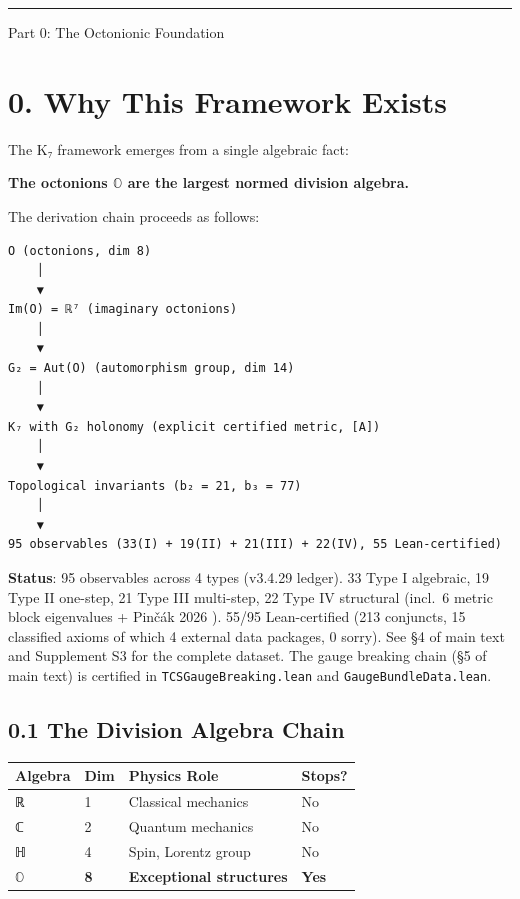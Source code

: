 \documentclass[11pt,a4paper]{article}
\begin{document}
\begin{center}\rule{\linewidth}{0.5pt}\end{center}

Part 0: The Octonionic Foundation

\section{0. Why This Framework Exists}\label{why-this-framework-exists}

The K₇ framework emerges from a single algebraic fact:

\textbf{The octonions \ensuremath{\mathbb{O}} are the largest normed division algebra.}

The derivation chain proceeds as follows:

\begin{verbatim}
O (octonions, dim 8)
    │
    ▼
Im(O) = ℝ⁷ (imaginary octonions)
    │
    ▼
G₂ = Aut(O) (automorphism group, dim 14)
    │
    ▼
K₇ with G₂ holonomy (explicit certified metric, [A])
    │
    ▼
Topological invariants (b₂ = 21, b₃ = 77)
    │
    ▼
95 observables (33(I) + 19(II) + 21(III) + 22(IV), 55 Lean-certified)
\end{verbatim}

\textbf{Status}: 95 observables across 4 types (v3.4.29 ledger). 33 Type I algebraic, 19 Type II one-step, 21 Type III multi-step, 22 Type IV structural (incl.~6 metric block eigenvalues + Pinčák 2026 \cite{42}). 55/95 Lean-certified (213 conjuncts, 15 classified axioms of which 4 external data packages, 0 sorry). See §4 of main text and Supplement S3 for the complete dataset. The gauge breaking chain (§5 of main text) is certified in \texttt{TCSGauge\allowbreak{}Breaking.\allowbreak{}lean} and \texttt{Gauge\allowbreak{}Bundle\allowbreak{}Data.\allowbreak{}lean}.

\subsection{0.1 The Division Algebra Chain}\label{the-division-algebra-chain}

\begin{longtable}[]{@{}llll@{}}
\toprule\noalign{}
Algebra & Dim & Physics Role & Stops? \\
\midrule\noalign{}
\endhead
\bottomrule\noalign{}
\endlastfoot
ℝ & 1 & Classical mechanics & No \\
ℂ & 2 & Quantum mechanics & No \\
ℍ & 4 & Spin, Lorentz group & No \\
\textbf{\ensuremath{\mathbb{O}}} & \textbf{8} & \textbf{Exceptional structures} & \textbf{Yes} \\
\end{longtable}
\end{document}
